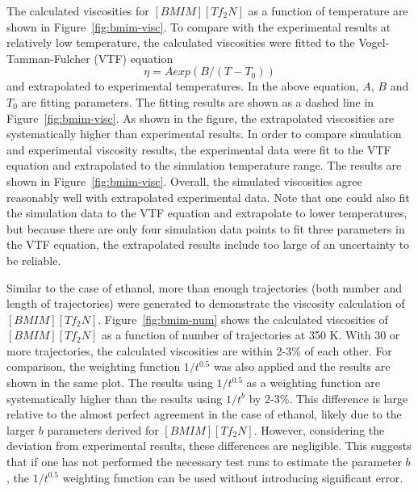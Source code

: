 \documentclass[12pt]{article}
\begin{document}
The calculated viscosities for $[BMIM][Tf_2N]$ as a function of temperature are shown in Figure~\ref{fig:bmim-visc}.
To compare with the experimental results at relatively low temperature,
the calculated viscosities were fitted to
the Vogel-Tamman-Fulcher (VTF) equation
\cite{VTF}
\begin{equation}
{\eta = A exp(B/(T-T_0))  }
\label{eq:VTF}
\end{equation}
and extrapolated to experimental temperatures.
In the above equation,
$A$, $B$ and $T_0$ are fitting parameters.
The fitting results are shown as a dashed line in Figure~\ref{fig:bmim-visc}.
As shown in the figure,
the extrapolated viscosities are systematically higher than experimental results.
\cite{Gadzuric.JCED.57.1072.2012,
Katsuta.JCED.55.1588.2010,
Watanabe.JPCB.110.19593.2006,
Majer.GC.8.172.2006,
Watanabe.JPCB.109.6103.2005,
VanderNoot.JEC.568.167.2004}
In order to compare simulation and experimental viscosity results, the experimental data were fit to the VTF equation and  
extrapolated to the simulation temperature range.
The results are shown in Figure~\ref{fig:bmim-visc}.
Overall, the simulated viscosities agree reasonably well with extrapolated experimental data. Note that one could also fit the simulation data to the VTF equation and extrapolate to lower temperatures, but because there are only four simulation data points to fit three parameters in the VTF equation, 
the extrapolated results include too large of an uncertainty to be reliable.

Similar to the case of ethanol,
more than enough trajectories (both number and length of trajectories) were generated
to demonstrate the viscosity calculation of $[BMIM][Tf_2N]$.
Figure~\ref{fig:bmim-num} shows the calculated viscosities of $[BMIM][Tf_2N]$ as a function of number of trajectories at 350 K.
With 30 or more trajectories,
the calculated viscosities are within 2-3\% of each other.
For comparison,
the weighting function $1/t^{0.5}$ was also applied and the results are shown in the same plot.
The results using $1/t^{0.5}$ as a weighting function are systematically higher than the results using $1/t^b$ by 2-3\%.
This difference is large relative to the almost perfect agreement in the case of ethanol,
likely due to the larger $b$ parameters derived for $[BMIM][Tf_2N]$.
However, considering the deviation from experimental results,
these differences are negligible. This suggests that if one has not performed the necessary test runs to estimate the parameter $b$, the 
$1/t^{0.5}$ weighting function can be used without introducing significant error.
\end{document}
